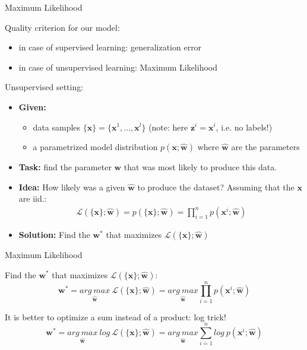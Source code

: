 \documentclass[xcolor=pdftex,dvipsnames,table]{beamer}
\begin{document}
\begin{frame}{Maximum Likelihood}
	\par
	\scriptsize
	\textcolor{NavyBlue}{Quality criterion for our model:}
	\begin{itemize}
		\item in case of supervised learning: generalization error
		\item in case of unsupervised learning: Maximum Likelihood
	\end{itemize}
	
	\textcolor{NavyBlue}{Unsupervised setting:}
	\begin{itemize}
		\item \textbf{Given:}
			\begin{itemize} \scriptsize
				\item data samples $\{\mathbf{x} \} = \{\mathbf{x}^1, \ldots, \mathbf{x}^l\}$   (note: here $\mathbf{z}^i =  \mathbf{x}^i$, i.e. no labels!)
				\item a parametrized model distribution $p(\mathbf{x} ; \hat{\mathbf{w}})$ where $\hat{\mathbf{w}}$ are the parameters
			\end{itemize}  
		\item \textbf{Task:} find the parameter $\mathbf{w}$ that was most likely to produce this data.
		\item \textbf{Idea:} How likely was a given $\hat{\mathbf{w}}$ to produce the dataset? Assuming that the $\mathbf{x}$ are iid.:
	\begin{align*}
		\mathcal{L}(\{\mathbf{x}\}; \hat{\mathbf{w}}) = p(\{\mathbf{x}\};\hat{\mathbf{w}}) =  \prod_{i=1}^n p(\mathbf{x}^i ; \hat{\mathbf{w}})
	\end{align*}
	\item \textbf{Solution:} Find the $\mathbf{w}^*$ that maximizes $\mathcal{L}(\{\mathbf{x}\}; \hat{\mathbf{w}})$ %
	\end{itemize}
\end{frame}


\begin{frame}{Maximum Likelihood}
	\par
	\scriptsize
	\textcolor{NavyBlue}{Find the $\mathbf{w}^*$ that maximizes $\mathcal{L}(\{\mathbf{x}\}; \hat{\mathbf{w}})$:}
	\begin{equation*}
		\mathbf{w}^* = \underset{ \hat{\mathbf{w}}}{arg \ max} \ \mathcal{L}(\{\mathbf{x}\}; \hat{\mathbf{w}}) = \underset{\hat{\mathbf{w}}}{arg \ max}\prod_{i=1}^n p(\mathbf{x}^i ; \hat{\mathbf{w}})
	\end{equation*}
	
	\textcolor{NavyBlue}{It is better to optimize a sum instead of a product: log trick!}
	\begin{equation*}
		\mathbf{w}^* = \underset{ \hat{\mathbf{w}}}{arg \ max} \ log \ \mathcal{L}(\{\mathbf{x}\}; \hat{\mathbf{w}}) = \underset{\hat{\mathbf{w}}}{arg \ max}\sum_{i=1}^n log \ p(\mathbf{x}^i ; \hat{\mathbf{w}})
	\end{equation*}
\end{frame}
\end{document}
